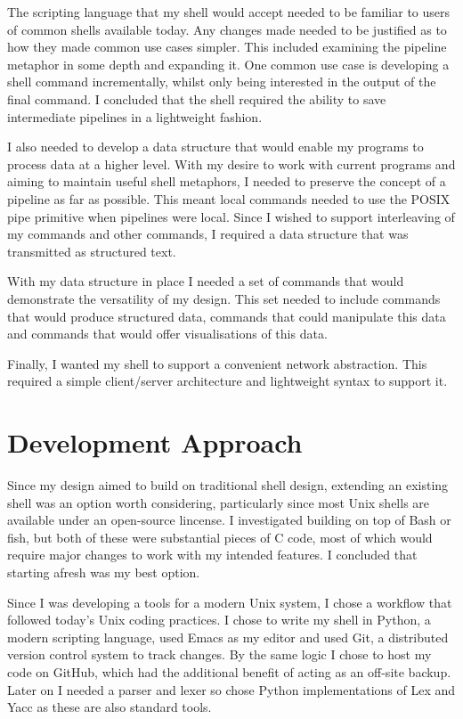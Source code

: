 \documentclass[12pt,twoside,notitlepage]{report}
\begin{document}
The scripting language that my shell would accept needed to be familiar to users
of common shells available today. Any changes made needed to be justified as to
how they made common use cases simpler. This included examining the pipeline
metaphor in some depth and expanding it. One common use case is developing a
shell command incrementally, whilst only being interested in the output of the
final command. I concluded that the shell required the ability to save
intermediate pipelines in a lightweight fashion.

I also needed to develop a data structure that would enable my programs to
process data at a higher level. With my desire to work with current programs and
aiming to maintain useful shell metaphors, I needed to preserve the concept of a
pipeline as far as possible. This meant local commands needed to use the POSIX
pipe primitive when pipelines were local. Since I wished to support interleaving
of my commands and other commands, I required a data structure that was
transmitted as structured text.

With my data structure in place I needed a set of commands that would
demonstrate the versatility of my design. This set needed to include commands
that would produce structured data, commands that could manipulate this data and
commands that would offer visualisations of this data.

Finally, I wanted my shell to support a convenient network abstraction. This
required a simple client/server architecture and lightweight syntax to support it.

\section{Development Approach}
Since my design aimed to build on traditional shell design, extending an
existing shell was an option worth considering, particularly since most Unix
shells are available under an open-source lincense. I investigated building on
top of Bash or fish, but both of these were substantial pieces of C code, most
of which would require major changes to work with my intended features. I
concluded that starting afresh was my best option.

Since I was developing a tools for a modern Unix system, I chose a workflow that
followed today's Unix coding practices. I chose to write my shell in Python, a
modern scripting language, used Emacs as my editor and used Git, a distributed
version control system to track changes. By the same logic I chose to host my
code on GitHub, which had the additional benefit of acting as an off-site
backup. Later on I needed a parser and lexer so chose Python implementations of
Lex and Yacc as these are also standard tools.
\end{document}
